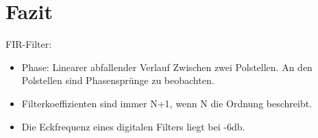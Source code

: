 \section{Fazit}

FIR-Filter:
\begin{itemize}
\item Phase: Linearer abfallender Verlauf Zwischen zwei Polstellen. An den Polstellen sind Phasensprünge zu beobachten.
\item Filterkoeffizienten sind immer N+1, wenn N die Ordnung beschreibt.
\item Die Eckfrequenz eines digitalen Filters liegt bei -6db.
\end{itemize}